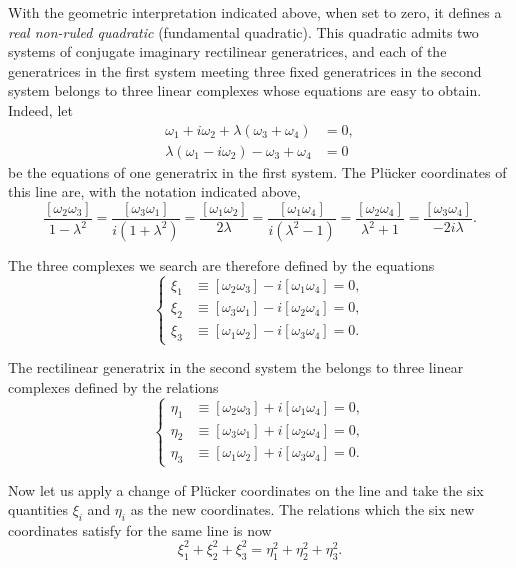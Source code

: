 \documentclass[leqno,12pt]{article}
\theoremstyle{shape1}
\theoremstyle{shape0}
\theoremstyle{shape2}
\theoremstyle{definition}
\begin{document}
With the geometric interpretation indicated above, when set to zero, it defines a \emph{real non-ruled quadratic} (fundamental quadratic). This quadratic admits two systems of conjugate imaginary rectilinear generatrices, and each of the generatrices in the first system meeting three fixed generatrices in the second system belongs to three linear complexes whose equations are easy to obtain. Indeed, let
\begin{align*}
  \omega_{1}+i\omega_{2}+\lambda(\omega_{3}+\omega_{4})&=0,\\
  \lambda(\omega_{1}-i\omega_{2})-\omega_{3}+\omega_{4}&=0
\end{align*}
be the equations of one generatrix in the first system. The Plücker coordinates of this line are, with the notation indicated above,
\[
\frac{[\omega_{2}\omega_{3}]}{1-\lambda^{2}}=\frac{[\omega_{3}\omega_{1}]}{i(1+\lambda^{2})}=\frac{[\omega_{1}\omega_{2}]}{2\lambda}=\frac{[\omega_{1}\omega_{4}]}{i(\lambda^{2}-1)}=\frac{[\omega_{2}\omega_{4}]}{\lambda^{2}+1}=\frac{[\omega_{3}\omega_{4}]}{-2 i\lambda}.
\]

The three complexes we search are therefore defined by the equations
\begin{equation}
  \label{eq:44}
  \left\{
    \begin{aligned}
      \xi_{1}&\equiv[\omega_{2}\omega_{3}]-i[\omega_{1}\omega_{4}]=0,\\
      \xi_{2}&\equiv[\omega_{3}\omega_{1}]-i[\omega_{2}\omega_{4}]=0,\\
      \xi_{3}&\equiv[\omega_{1}\omega_{2}]-i[\omega_{3}\omega_{4}]=0.
    \end{aligned}
  \right.
\end{equation}

The rectilinear generatrix in the second system the belongs to three linear complexes defined by the relations
\begin{equation}
  \label{eq:45}
  \left\{
    \begin{aligned}
      \eta_{1}&\equiv[\omega_{2}\omega_{3}]+i[\omega_{1}\omega_{4}]=0,\\
      \eta_{2}&\equiv[\omega_{3}\omega_{1}]+i[\omega_{2}\omega_{4}]=0,\\
      \eta_{3}&\equiv[\omega_{1}\omega_{2}]+i[\omega_{3}\omega_{4}]=0.
    \end{aligned}
  \right.
\end{equation}

Now let us apply a change of Plücker coordinates on the line and take the six quantities $\xi_{i}$ and $\eta_{i}$ as the new coordinates. The relations which the six new coordinates satisfy for the same line is now
\begin{equation}
  \label{eq:46}
  \xi_{1}^{2}+\xi_{2}^{2}+\xi_{3}^{2}=\eta_{1}^{2}+\eta_{2}^{2}+\eta_{3}^{2}.
\end{equation}
\end{document}
